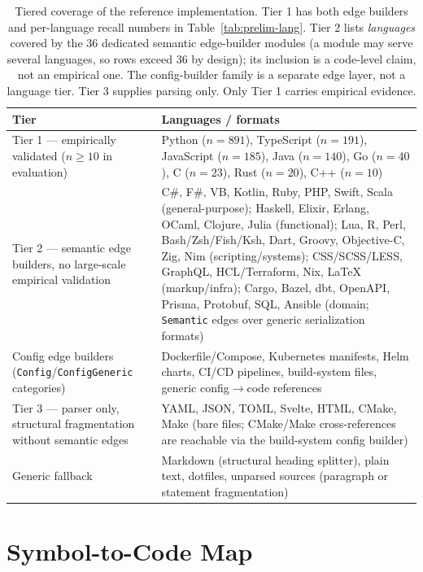 \documentclass[11pt, a4paper]{article}
\begin{document}
\begin{table}[h]
\centering
\small
\begin{tabular}{p{4.2cm}p{10.2cm}}
\toprule
\textbf{Tier} & \textbf{Languages / formats} \\
\midrule
Tier 1 — empirically validated ($n{\geq}10$ in evaluation) &
Python ($n{=}891$), TypeScript ($n{=}191$), JavaScript ($n{=}185$),
Java ($n{=}140$), Go ($n{=}40$), C ($n{=}23$), Rust ($n{=}20$), C++ ($n{=}10$) \\
\midrule
Tier 2 — semantic edge builders, no large-scale empirical validation &
C\#, F\#, VB, Kotlin, Ruby, PHP, Swift, Scala (general-purpose);
Haskell, Elixir, Erlang, OCaml, Clojure, Julia (functional);
Lua, R, Perl, Bash/Zsh/Fish/Ksh, Dart, Groovy, Objective-C, Zig, Nim (scripting/systems);
CSS/SCSS/LESS, GraphQL, HCL/Terraform, Nix, LaTeX (markup/infra);
Cargo, Bazel, dbt, OpenAPI, Prisma, Protobuf, SQL, Ansible (domain; \texttt{Semantic} edges over generic serialization formats) \\
\midrule
Config edge builders (\texttt{Config}/\texttt{ConfigGeneric} categories) &
Dockerfile/Compose, Kubernetes manifests, Helm charts, CI/CD pipelines, build-system files, generic config$\to$code references \\
\midrule
Tier 3 — parser only, structural fragmentation without semantic edges &
YAML, JSON, TOML, Svelte, HTML, CMake, Make (bare files; CMake/Make cross-references are reachable via the build-system config builder) \\
\midrule
Generic fallback &
Markdown (structural heading splitter), plain text, dotfiles, unparsed sources (paragraph or statement fragmentation) \\
\bottomrule
\end{tabular}
\caption{Tiered coverage of the reference implementation. Tier 1 has both edge builders and per-language recall numbers in Table~\ref{tab:prelim-lang}. Tier 2 lists \emph{languages} covered by the 36 dedicated semantic edge-builder modules (a module may serve several languages, so rows exceed 36 by design); its inclusion is a code-level claim, not an empirical one. The config-builder family is a separate edge layer, not a language tier. Tier 3 supplies parsing only. Only Tier 1 carries empirical evidence.}
\label{tab:language-support}
\end{table}

\newpage
\section{Symbol-to-Code Map}
\label{sec:symbol-map}
\end{document}
